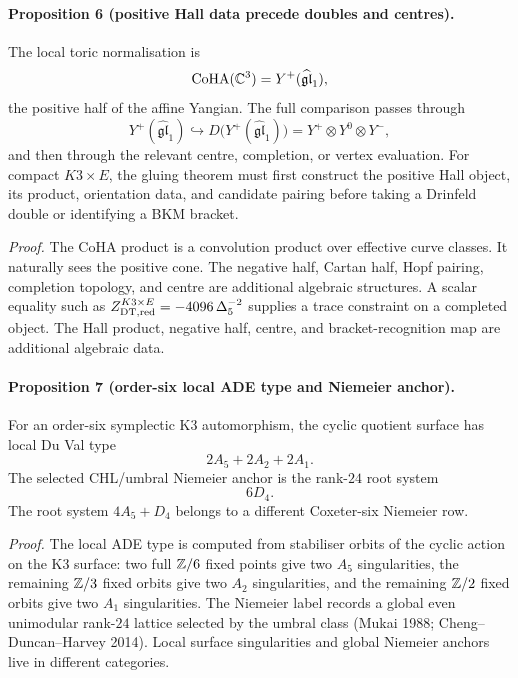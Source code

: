 \paragraph{Proposition 6 (positive Hall data precede doubles and
centres).}
The local toric normalisation is
\[
\mathrm{CoHA}(\mathbb C^3)=Y^+(\widehat{\mathfrak{gl}}_1),
\]
the positive half of the affine Yangian. The full comparison passes
through
\[
Y^+(\widehat{\mathfrak{gl}}_1)
\hookrightarrow
D\bigl(Y^+(\widehat{\mathfrak{gl}}_1)\bigr)
=Y^+\otimes Y^0\otimes Y^-,
\]
and then through the relevant centre, completion, or vertex evaluation.
For compact $K3\times E$, the gluing theorem must first construct the
positive Hall object, its product, orientation data, and candidate
pairing before taking a Drinfeld double or identifying a BKM bracket.

\emph{Proof.}
The CoHA product is a convolution product over effective curve classes.
It naturally sees the positive cone. The negative half, Cartan half,
Hopf pairing, completion topology, and centre are additional algebraic
structures. A scalar equality such as
$Z^{K3\times E}_{\mathrm{DT},\mathrm{red}}=-4096\,\Delta_5^{-2}$ supplies a
trace constraint on a completed object. The Hall product, negative half,
centre, and bracket-recognition map are additional algebraic data.

\paragraph{Proposition 7 (order-six local ADE type and Niemeier anchor).}
For an order-six symplectic K3 automorphism, the cyclic quotient surface
has local Du Val type
\[
2A_5+2A_2+2A_1 .
\]
The selected CHL/umbral Niemeier anchor is the rank-$24$ root system
\[
6D_4 .
\]
The root system $4A_5+D_4$ belongs to a different Coxeter-six Niemeier
row.

\emph{Proof.}
The local ADE type is computed from stabiliser orbits of the cyclic
action on the K3 surface: two full $\mathbb{Z}/6$ fixed points give two
$A_5$ singularities, the remaining $\mathbb{Z}/3$ fixed orbits give two
$A_2$ singularities, and the remaining $\mathbb{Z}/2$ fixed orbits give two
$A_1$ singularities. The Niemeier label records a global even
unimodular rank-$24$ lattice selected by the umbral class
(Mukai 1988; Cheng--Duncan--Harvey 2014). Local surface singularities
and global Niemeier anchors live in different categories.

